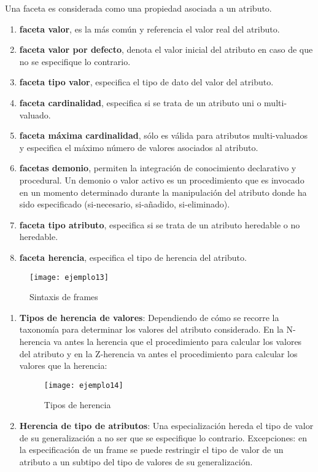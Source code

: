 \documentclass[12pt]{article}
\begin{document}
Una faceta es considerada como una propiedad asociada a un atributo.
\begin{enumerate}
\item \textbf{faceta valor}, es la más común y referencia el valor real del atributo.
\item \textbf{faceta valor por defecto}, denota el valor inicial del atributo en caso de que no se especifique lo contrario.
\item \textbf{faceta tipo valor}, especifica el tipo de dato del valor del atributo.
\item \textbf{faceta cardinalidad}, especifica si se trata de un atributo uni o multi-valuado.
\item \textbf{faceta máxima cardinalidad}, sólo es válida para atributos multi-valuados y especifica el máximo número de valores asociados al atributo.
\item \textbf{facetas demonio}, permiten la integración de conocimiento declarativo y procedural. Un demonio o valor activo es un procedimiento que es invocado en un momento determinado durante la manipulación del atributo donde ha sido especificado (si-necesario, si-añadido, si-eliminado).
\item \textbf{faceta tipo atributo}, especifica si se trata de un atributo heredable o no heredable.
\item  \textbf{faceta herencia}, especifica el tipo de herencia del atributo.
\end{enumerate}

\begin{figure}[H]
\centering
\texttt{[image: ejemplo13]}
\caption{Sintaxis de frames}
\label{fig:ejemplo13}
\end{figure}

\begin{enumerate}
\item \textbf{Tipos de herencia de valores}: Dependiendo de cómo se recorre la taxonomía para determinar los valores del atributo considerado. En la N-herencia va antes la herencia que el procedimiento para calcular los valores del atributo y en la Z-herencia va antes el procedimiento para calcular los valores que la herencia:
\begin{figure}[H]
\centering
\texttt{[image: ejemplo14]}
\caption{Tipos de herencia}
\label{fig:ejemplo14}
\end{figure}
\item \textbf{Herencia de tipo de atributos}: Una especialización hereda el tipo de valor de su generalización a no ser que se especifique lo contrario. Excepciones: en la especificación de un frame se puede restringir el tipo de valor de un atributo a un subtipo del tipo de valores de su generalización.
\end{enumerate}
\end{document}
